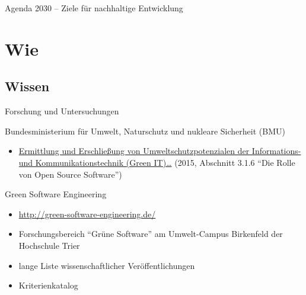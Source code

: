 \documentclass[t]{beamer}
\begin{document}
\begin{frame}{Agenda 2030 -- Ziele für nachhaltige Entwicklung}
\end{frame}

\section{Wie}

\subsection{Wissen}

\begin{frame}{Forschung und Untersuchungen}
    \begin{block}{Bundesministerium für Umwelt, Naturschutz und nukleare Sicherheit (BMU)}
        \begin{itemize}
            \item \href{https://www.bmu.de/themen/forschung-foerderung/forschung/forschungs-und-entwicklungsberichte/details/ermittlung-und-erschliessung-von-umweltschutzpotenzialen-der-informations-und-kommunikationstechnik/}{Ermittlung und Erschließung von Umweltschutzpotenzialen der Informations- und Kommunikationstechnik (Green IT)…} (2015, Abschnitt 3.1.6 \enquote{Die Rolle von Open Source Software})
        \end{itemize}
    \end{block}
    \begin{block}{Green Software Engineering}
        \begin{itemize}
            \item \url{http://green-software-engineering.de/}
            \item Forschungsbereich \enquote{Grüne Software} am Umwelt-Campus Birkenfeld der Hochschule Trier
            \item lange Liste wissenschaftlicher Veröffentlichungen
            \item Kriterienkatalog
        \end{itemize}
    \end{block}
\end{frame}
\end{document}
